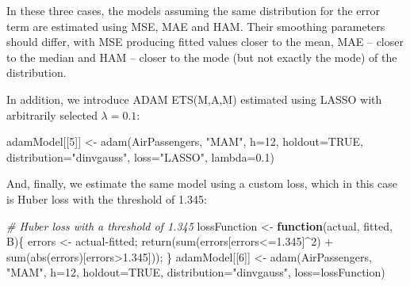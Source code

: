 \documentclass[
]{book}
\newenvironment{Shaded}{\begin{snugshade}}{\end{snugshade}}
\newcommand{\AttributeTok}[1]{\textcolor[rgb]{0.77,0.63,0.00}{#1}}
\newcommand{\CommentTok}[1]{\textcolor[rgb]{0.56,0.35,0.01}{\textit{#1}}}
\newcommand{\ConstantTok}[1]{\textcolor[rgb]{0.00,0.00,0.00}{#1}}
\newcommand{\ControlFlowTok}[1]{\textcolor[rgb]{0.13,0.29,0.53}{\textbf{#1}}}
\newcommand{\DecValTok}[1]{\textcolor[rgb]{0.00,0.00,0.81}{#1}}
\newcommand{\FloatTok}[1]{\textcolor[rgb]{0.00,0.00,0.81}{#1}}
\newcommand{\FunctionTok}[1]{\textcolor[rgb]{0.00,0.00,0.00}{#1}}
\newcommand{\NormalTok}[1]{#1}
\newcommand{\OtherTok}[1]{\textcolor[rgb]{0.56,0.35,0.01}{#1}}
\newcommand{\SpecialCharTok}[1]{\textcolor[rgb]{0.00,0.00,0.00}{#1}}
\newcommand{\StringTok}[1]{\textcolor[rgb]{0.31,0.60,0.02}{#1}}
\theoremstyle{definition}
\theoremstyle{definition}
\theoremstyle{definition}
\theoremstyle{definition}
\theoremstyle{remark}
\begin{document}
In these three cases, the models assuming the same distribution for the error term are estimated using MSE, MAE and HAM. Their smoothing parameters should differ, with MSE producing fitted values closer to the mean, MAE -- closer to the median and HAM -- closer to the mode (but not exactly the mode) of the distribution.

In addition, we introduce ADAM ETS(M,A,M) estimated using LASSO with arbitrarily selected \(\lambda=0.1\):

\begin{Shaded}
\begin{Highlighting}[]
\NormalTok{adamModel[[}\DecValTok{5}\NormalTok{]] }\OtherTok{\textless{}{-}} \FunctionTok{adam}\NormalTok{(AirPassengers, }\StringTok{"MAM"}\NormalTok{, }\AttributeTok{h=}\DecValTok{12}\NormalTok{, }\AttributeTok{holdout=}\ConstantTok{TRUE}\NormalTok{,}
                       \AttributeTok{distribution=}\StringTok{"dinvgauss"}\NormalTok{,}
                       \AttributeTok{loss=}\StringTok{"LASSO"}\NormalTok{, }\AttributeTok{lambda=}\FloatTok{0.1}\NormalTok{)}
\end{Highlighting}
\end{Shaded}

And, finally, we estimate the same model using a custom loss, which in this case is Huber loss \citep{Huber1992} with the threshold of 1.345:

\begin{Shaded}
\begin{Highlighting}[]
\CommentTok{\# Huber loss with a threshold of 1.345}
\NormalTok{lossFunction }\OtherTok{\textless{}{-}} \ControlFlowTok{function}\NormalTok{(actual, fitted, B)\{}
\NormalTok{  errors }\OtherTok{\textless{}{-}}\NormalTok{ actual}\SpecialCharTok{{-}}\NormalTok{fitted;}
  \FunctionTok{return}\NormalTok{(}\FunctionTok{sum}\NormalTok{(errors[errors}\SpecialCharTok{\textless{}=}\FloatTok{1.345}\NormalTok{]}\SpecialCharTok{\^{}}\DecValTok{2}\NormalTok{) }\SpecialCharTok{+}
         \FunctionTok{sum}\NormalTok{(}\FunctionTok{abs}\NormalTok{(errors)[errors}\SpecialCharTok{\textgreater{}}\FloatTok{1.345}\NormalTok{]));}
\NormalTok{\}}
\NormalTok{adamModel[[}\DecValTok{6}\NormalTok{]] }\OtherTok{\textless{}{-}} \FunctionTok{adam}\NormalTok{(AirPassengers, }\StringTok{"MAM"}\NormalTok{, }\AttributeTok{h=}\DecValTok{12}\NormalTok{, }\AttributeTok{holdout=}\ConstantTok{TRUE}\NormalTok{,}
                       \AttributeTok{distribution=}\StringTok{"dinvgauss"}\NormalTok{,}
                       \AttributeTok{loss=}\NormalTok{lossFunction)}
\end{Highlighting}
\end{Shaded}
\end{document}
